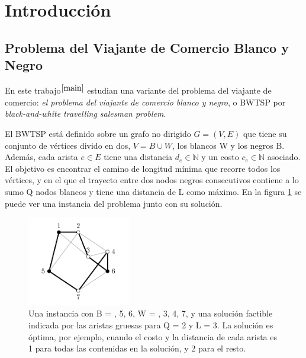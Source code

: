 \documentclass[10pt, a4paper]{article}
\theoremstyle{definition}
\begin{document}




\maketitle

\tableofcontents

\newpage

\section{Introducción}

\subsection{Problema del Viajante de Comercio Blanco y Negro}
En este trabajo$^{\cite{main}}$ estudian una variante del problema del viajante de comercio: \textit{el problema del viajante de comercio blanco y negro}, o BWTSP por \textit{black-and-white travelling salesman problem}.

El BWTSP está definido sobre un grafo no dirigido $G = (V,E)$ que tiene su conjunto de vértices divido en dos, $V = B \cup W$, los blancos W y los negros B. Además, cada arista $e \in E$ tiene una distancia $d_e \in \mathds{N}$ y un costo $c_e \in \mathds{N}$ asociado. El objetivo es encontrar el camino de longitud mínima que recorre todos los vértices, y en el que el trayecto entre dos nodos negros consecutivos contiene a lo sumo Q nodos blancos y tiene una distancia de L como máximo. En la figura \ref{fig:ejemplo_bwtsp} se puede ver una instancia del problema junto con su solución.

\begin{figure}[H]
    \centering
    \includegraphics[width=0.4\textwidth]{ejemplo_bwtsp.png}
    \caption{Una instancia con B = , 5, 6\textbraceright, W = , 3, 4, 7\textbraceright, y una solución factible indicada por las aristas gruesas para Q = 2 y L = 3. La solución es óptima, por ejemplo, cuando el costo y la distancia de cada arista es 1 para todas las contenidas en la solución, y 2 para el resto.}
    \label{fig:ejemplo_bwtsp}
\end{figure}
\end{document}
